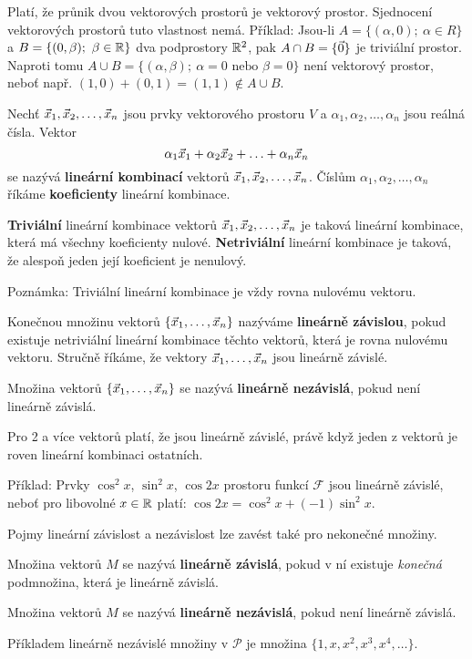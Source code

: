 Platí, že průnik dvou vektorových prostorů je vektorový prostor.
Sjednocení vektorových prostorů tuto vlastnost nemá.
Příklad: Jsou-li $A=\{(\alpha,0);~\alpha\in R\}$ a $B=\{(0,\beta);~\beta\in\mathbb R\}$ dva podprostory $\mathbb R^2$, pak $A\cap B=\{\vec{0}\}$ je triviální prostor.
Naproti tomu $A\cup B=\{(\alpha,\beta);~\alpha=0\mbox{ nebo }\beta=0\}$ není vektorový prostor, neboť např. $(1,0)+(0,1)=(1,1)\notin A\cup B$.

\begin{df}
Nechť $\vec{x}_1,\vec{x}_2,\ldots,\vec{x}_n$ jsou prvky vektorového prostoru $V$ a $\alpha_1,\alpha_2,\ldots,\alpha_n$ jsou reálná čísla.
Vektor
$$ \alpha_1\vec{x}_1+\alpha_2\vec{x}_2+\ldots+\alpha_n\vec{x}_n $$
se nazývá {\bf lineární kombinací} vektorů $\vec{x}_1,\vec{x}_2,\ldots,\vec{x}_n$.
Číslům $\alpha_1,\alpha_2,\ldots,\alpha_n$ říkáme {\bf koeficienty} lineární kombinace.
\end{df}

\begin{df}
{\bf Triviální} lineární kombinace vektorů $\vec{x}_1,\vec{x}_2,\ldots,\vec{x}_n$ je taková lineární kombinace, která má všechny koeficienty nulové.
{\bf Netriviální} lineární kombinace je taková, že alespoň jeden její koeficient je nenulový.
\end{df}

Poznámka: Triviální lineární kombinace je vždy rovna nulovému vektoru.

\begin{df}
Konečnou množinu vektorů $\{\vec{x}_1,\ldots,\vec{x}_n\}$ nazýváme {\bf lineárně závislou}, pokud existuje netriviální lineární kombinace těchto vektorů, která je rovna nulovému vektoru. Stručně říkáme, že vektory $\vec{x}_1,\ldots,\vec{x}_n$ jsou lineárně závislé.

Množina vektorů $\{\vec{x}_1,\ldots,\vec{x}_n\}$ se nazývá {\bf lineárně nezávislá}, pokud není lineárně závislá.
\end{df}

Pro 2 a více vektorů platí, že jsou lineárně závislé, právě když jeden z vektorů je roven lineární kombinaci ostatních.

Příklad: Prvky $\cos^2x$, $\sin^2x$, $\cos2x$ prostoru funkcí $\mathcal F$ jsou lineárně závislé, neboť pro libovolné $x\in\mathbb R$ platí: $\cos2x=\cos^2x+(-1)\sin^2x$.

Pojmy lineární závislost a nezávislost lze zavést také pro nekonečné množiny.
\begin{df}
Množina vektorů $M$ se nazývá {\bf lineárně závislá}, pokud v ní existuje \emph{konečná} podmnožina, která je lineárně závislá.

Množina vektorů $M$ se nazývá {\bf lineárně nezávislá}, pokud není lineárně závislá.
\end{df}
Příkladem lineárně nezávislé množiny v $\mathcal P$ je množina $\{1,x,x^2,x^3,x^4,\ldots\}$.

